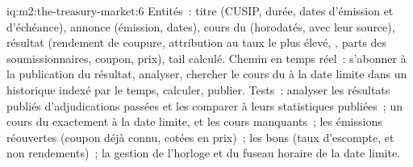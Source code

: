 \begin{solution}{iq:m2:the-treasury-market:6}
Entités~: titre (CUSIP, durée, dates d'émission et d'échéance), annonce
(émission, dates), cours du  (horodatés, avec leur source), résultat (rendement
de coupure, attribution au taux le plus élevé, , parts des soumissionnaires, coupon, prix),
tail calculé. Chemin en temps réel~: s'abonner à la publication du résultat, analyser, chercher
le cours du  à la date limite dans un historique indexé par le temps, calculer,
publier. Tests~: analyser les résultats publiés d'adjudications passées et les comparer à leurs statistiques publiées~;
un cours du  exactement à la date limite, et les cours manquants~;
les émissions réouvertes (coupon déjà connu, cotées en prix)~;
les bons (taux d'escompte, et non rendements)~; la gestion de l'horloge et du fuseau horaire
de la date limite.
\end{solution}
